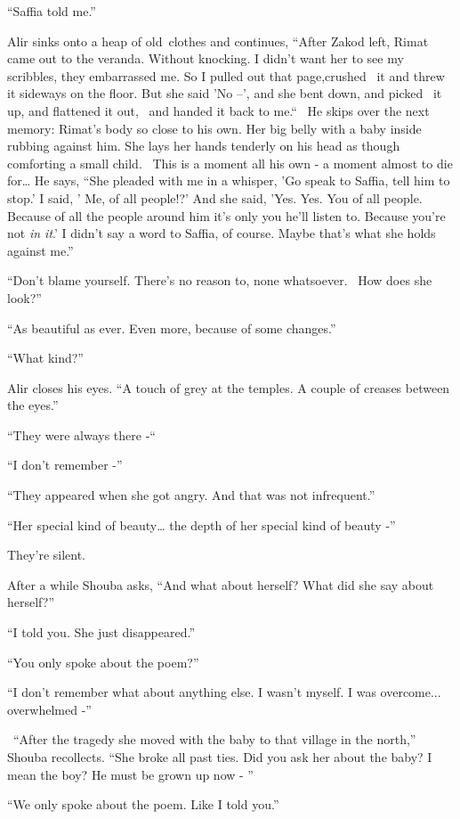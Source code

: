 \documentclass[twoside,11pt]{book}
\begin{document}
``Saffia told me.''

Alir sinks onto a heap of old~clothes and continues, ``After Zakod left, Rimat came out to the veranda.
Without knocking. I didn't want her to see my scribbles, they embarrassed me. So I pulled out that page,crushed \ it
and threw it sideways on the floor. But she said 'No --', and she bent down, and picked \ it up, and flattened it out,
\ and handed it back to me.``~ He skips over the next memory: Rimat's body so close to his own. Her big
belly with a baby inside rubbing against him. She lays her hands tenderly on his head as though comforting a small
child. \ This is a moment all his own - a moment almost to die for{\dots} He says, ``She pleaded with me
in a whisper, 'Go speak to Saffia, tell him to stop.' I said, ' Me, of all people!?' And she said, 'Yes. Yes. You of
all people. Because of all the people around him it's only you he'll listen to. Because you're not \textit{in it}.' I
didn't say a word to Saffia, of course. Maybe that's what she holds against me.''

``Don't blame yourself. There's no reason to, none whatsoever.~ How does she look?''

``As beautiful as ever. Even more, because of some changes.''

``What kind?''

Alir closes his eyes. ``A touch of grey at the temples. A couple of creases between the
eyes.''

``They were always there -``~

``I don't remember -''

``They appeared when she got angry. And that was not infrequent.''

``Her special kind of beauty{\dots} the depth of her special kind of beauty -''

They're silent.

After a while Shouba asks, ``And what about herself? What did she say about herself?''

``I told you. She just disappeared.''

``You only spoke about the poem?''

``I don't remember what about anything else. I wasn't myself. I was overcome... overwhelmed
-''

~``After the tragedy she moved with the baby to that village in the north,'' Shouba
recollects. ``She broke all past ties. Did you ask her about the baby? I mean the boy? He must be grown up
now - ''

``We only spoke about the poem. Like I told you.''
\end{document}
